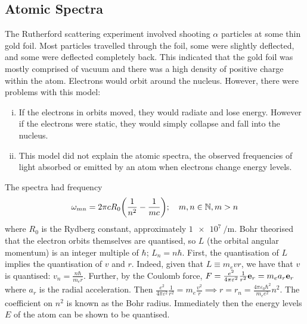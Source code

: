 \subsection{Atomic Spectra}
The Rutherford scattering experiment involved shooting \( \alpha \) particles at some thin gold foil.
Most particles travelled through the foil, some were slightly deflected, and some were deflected completely back.
This indicated that the gold foil was mostly comprised of vacuum and there was a high density of positive charge within the atom.
Electrons would orbit around the nucleus.
However, there were problems with this model:
\begin{enumerate}[(i)]
	\item If the electrons in orbits moved, they would radiate and lose energy.
	      However if the electrons were static, they would simply collapse and fall into the nucleus.
	\item This model did not explain the atomic spectra, the observed frequencies of light absorbed or emitted by an atom when electrons change energy levels.
\end{enumerate}
The spectra had frequency
\[
	\omega_{mn} = 2 \pi c R_0 \qty(\frac{1}{n^2} - \frac{1}{mc}); \quad m, n \in \mathbb N, m > n
\]
where \( R_0 \) is the Rydberg constant, approximately \( \SI{1e7}{\per\metre} \).
Bohr theorised that the electron orbits themselves are quantised, so \( L \) (the orbital angular momentum) is an integer multiple of \( \hbar \); \( L_n = n \hbar \).
First, the quantisation of \( L \) implies the quantisation of \( v \) and \( r \).
Indeed, given that \( L \equiv m_e v r \), we have that \( v \) is quantised: \( v_n = \frac{n\hbar}{m_e r} \).
Further, by the Coulomb force, \( F = \frac{e^2}{4 \pi \varepsilon^2} \frac{1}{r^2} \vb e_r = m_e a_r \vb e_r \) where \( a_r \) is the radial acceleration.
Then \( \frac{e^2}{4 \pi \varepsilon^2} \frac{1}{r^2} = m_e \frac{v^2}{r} \implies r = r_n = \frac{4 \pi \varepsilon_0 \hbar^2}{m_e e^2} n^2 \).
The coefficient on \( n^2 \) is known as the Bohr radius.
Immediately then the energy levels \( E \) of the atom can be shown to be quantised.
